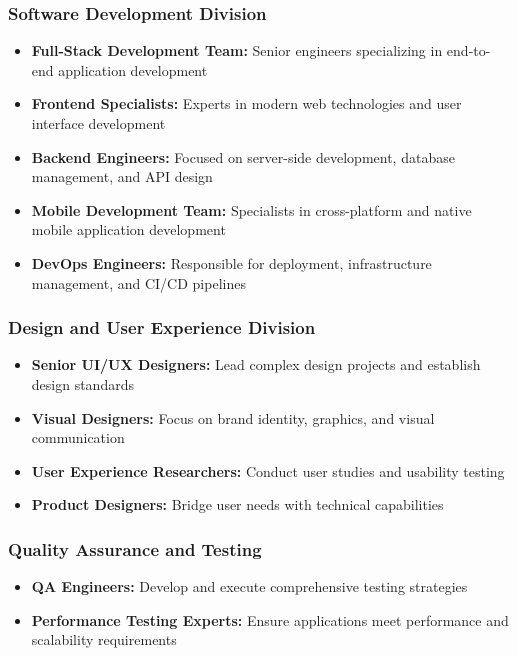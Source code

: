 \documentclass[12pt,a4paper]{report}
\newcommand{\skill}[1]{\textcolor{skillcolor}{\textbf{#1}}}
\newenvironment{coloritemize}
{\begin{itemize}[label=\textcolor{primaryblue}{$\bullet$}]}
{\end{itemize}}
\begin{document}
\subsubsection{Software Development Division}
\begin{coloritemize}
    \item \skill{Full-Stack Development Team:} Senior engineers specializing in end-to-end application development
    \item \skill{Frontend Specialists:} Experts in modern web technologies and user interface development
    \item \skill{Backend Engineers:} Focused on server-side development, database management, and API design
    \item \skill{Mobile Development Team:} Specialists in cross-platform and native mobile application development
    \item \skill{DevOps Engineers:} Responsible for deployment, infrastructure management, and CI/CD pipelines
\end{coloritemize}

\subsubsection{Design and User Experience Division}
\begin{coloritemize}
    \item \skill{Senior UI/UX Designers:} Lead complex design projects and establish design standards
    \item \skill{Visual Designers:} Focus on brand identity, graphics, and visual communication
    \item \skill{User Experience Researchers:} Conduct user studies and usability testing
    \item \skill{Product Designers:} Bridge user needs with technical capabilities
\end{coloritemize}

\subsubsection{Quality Assurance and Testing}
\begin{coloritemize}
    \item \skill{QA Engineers:} Develop and execute comprehensive testing strategies
    \item \skill{Performance Testing Experts:} Ensure applications meet performance and scalability requirements
\end{coloritemize}
\end{document}
